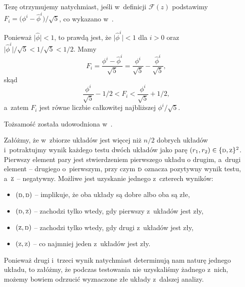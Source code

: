 \subproblem %
Tezę otrzymujemy natychmiast, jeśli w~definicji $\mathcal{F}(z)$ podstawimy $F_i=\bigl(\phi^i-\widehat\phi^i\bigr)/\sqrt{5}$, co wykazano w~.

\subproblem %
Ponieważ $\bigl|\widehat\phi\bigr|<1$, to prawdą jest, że $\bigl|\widehat\phi^i\bigr|<1$ dla $i>0$ oraz $\bigl|\widehat\phi^i\bigr|/\sqrt{5}<1/\sqrt{5}<1/2$. Mamy
\[
	F_i = \frac{\phi^i-\widehat\phi^i}{\sqrt{5}} = \frac{\phi^i}{\sqrt{5}}-\frac{\widehat\phi^i}{\sqrt{5}},
\]
skąd
\[
	\frac{\phi^i}{\sqrt{5}}-1/2 < F_i < \frac{\phi^i}{\sqrt{5}}+1/2,
\]
a~zatem $F_i$ jest równe liczbie całkowitej najbliższej $\phi^i/\sqrt{5}$.

\subproblem %
Tożsamość została udowodniona w~.


\subproblem %
Załóżmy, że w~zbiorze układów jest więcej niż $n/2$ dobrych układów i~potraktujmy wynik każdego testu dwóch układów jako parę $(r_1,r_2)\in\{{\scriptstyle\rm D},{\scriptstyle\rm Z}\}^2$. Pierwszy element pary jest stwierdzeniem pierwszego układu o drugim, a~drugi element -- drugiego o~pierwszym, przy czym ${\scriptstyle\rm D}$ oznacza pozytywny wynik testu, a~${\scriptstyle\rm Z}$ -- negatywny. Możliwe jest uzyskanie jednego z~czterech wyników:
\begin{itemize}
	\item $({\scriptstyle\rm D},{\scriptstyle\rm D})$ -- implikuje, że oba układy są dobre albo oba są złe,
	\item $({\scriptstyle\rm D},{\scriptstyle\rm Z})$ -- zachodzi tylko wtedy, gdy pierwszy z~układów jest zły,
	\item $({\scriptstyle\rm Z},{\scriptstyle\rm D})$ -- zachodzi tylko wtedy, gdy drugi z~układów jest zły,
	\item $({\scriptstyle\rm Z},{\scriptstyle\rm Z})$ -- co najmniej jeden z~układów jest zły.
\end{itemize}
Ponieważ drugi i~trzeci wynik natychmiast determinują nam naturę jednego układu, to załóżmy, że podczas testowania nie uzyskaliśmy żadnego z~nich, możemy bowiem odrzucić wyznaczone złe układy z~dalszej analizy.

